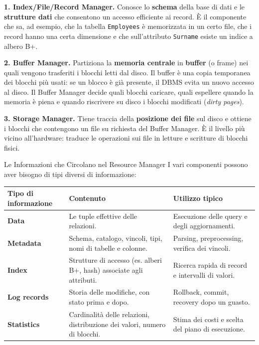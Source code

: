 \documentclass[12pt]{extarticle}
\begin{document}
\medskip
\noindent \textbf{1. Index/File/Record Manager.} Conosce lo \textbf{schema} della base di dati e le \textbf{strutture dati} che consentono un accesso efficiente ai record. È il componente che sa, ad esempio, che la tabella \texttt{Employees} è memorizzata in un certo file, che i record hanno una certa dimensione e che sull'attributo \texttt{Surname} esiste un indice a albero B+.

\medskip
\noindent \textbf{2. Buffer Manager.} Partiziona la \textbf{memoria centrale} in \textbf{buffer} (o frame) nei quali vengono trasferiti i blocchi letti dal disco. Il buffer è una copia temporanea dei blocchi più usati: se un blocco è già presente, il DBMS evita un nuovo accesso al disco. Il Buffer Manager decide quali blocchi caricare, quali espellere quando la memoria è piena e quando riscrivere su disco i blocchi modificati (\textit{dirty pages}).

\medskip
\noindent \textbf{3. Storage Manager.} Tiene traccia della \textbf{posizione dei file} sul disco e ottiene i blocchi che contengono un file su richiesta del Buffer Manager. È il livello più vicino all'hardware: traduce le operazioni sui file in letture e scritture di blocchi fisici.

\begin{cbox}{Le Informazioni che Circolano nel Resource Manager}
\noindent I vari componenti possono aver bisogno di tipi diversi di informazione:
\begin{center}
\small
\begin{tabular}{@{}lp{6.2cm}p{4.4cm}@{}}
    \toprule
    \textbf{Tipo di informazione} & \textbf{Contenuto} & \textbf{Utilizzo tipico} \\
    \midrule
    \textbf{Data} & Le tuple effettive delle relazioni. & Esecuzione delle query e degli aggiornamenti. \\
    \addlinespace
    \textbf{Metadata} & Schema, catalogo, vincoli, tipi, nomi di tabelle e colonne. & Parsing, preprocessing, verifica dei vincoli. \\
    \addlinespace
    \textbf{Index} & Strutture di accesso (es. alberi B+, hash) associate agli attributi. & Ricerca rapida di record e intervalli di valori. \\
    \addlinespace
    \textbf{Log records} & Storia delle modifiche, con stato prima e dopo. & Rollback, commit, recovery dopo un guasto. \\
    \addlinespace
    \textbf{Statistics} & Cardinalità delle relazioni, distribuzione dei valori, numero di blocchi. & Stima dei costi e scelta del piano di esecuzione. \\
    \bottomrule
\end{tabular}
\end{center}
\end{cbox}
\end{document}
